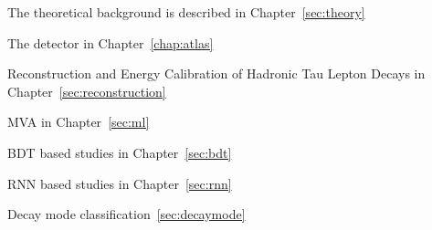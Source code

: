 The theoretical background is described in Chapter~\ref{sec:theory}

The detector in Chapter~\ref{chap:atlas}

Reconstruction and Energy Calibration of Hadronic Tau Lepton Decays in
Chapter~\ref{sec:reconstruction}

MVA in Chapter~\ref{sec:ml}

BDT based studies in Chapter~\ref{sec:bdt}

RNN based studies in Chapter~\ref{sec:rnn}

Decay mode classification~\ref{sec:decaymode}



